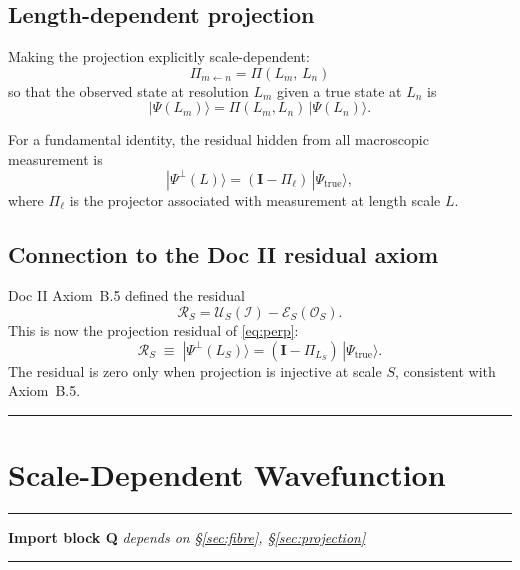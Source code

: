 \documentclass[11pt, a4paper, oneside]{article}
\theoremstyle{definition}
\theoremstyle{plain}
\theoremstyle{remark}
\newcommand{\Proj}[2]{\Pi_{#1 \leftarrow #2}}
\newcommand{\ProjL}{\Pi_{\ell}}
\newcommand{\Psitrue}{|\Psi_{\mathrm{true}}\rangle}
\begin{document}
\subsection{Length-dependent projection}

Making the projection explicitly scale-dependent:
\begin{equation}
  \Proj{m}{n} = \Pi(L_m,\, L_n)
  \label{eq:proj_length}
\end{equation}
so that the observed state at resolution $L_m$ given a true state at $L_n$ is
\begin{equation}
  |\Psi(L_m)\rangle = \Pi(L_m, L_n)\,|\Psi(L_n)\rangle.
  \label{eq:proj_length2}
\end{equation}

For a fundamental identity, the residual hidden from all macroscopic
measurement is
\begin{equation}
  |\Psi^\perp(L)\rangle = (\mathbf{I} - \ProjL)\,\Psitrue,
  \label{eq:perp}
\end{equation}
where $\ProjL$ is the projector associated with measurement at
length scale $L$.

\subsection{Connection to the Doc II residual axiom}

Doc II Axiom~B.5 defined the residual
\begin{equation}
  \mathcal{R}_S = \mathcal{U}_S(\mathcal{I}) - \mathcal{E}_S(\mathcal{O}_S).
  \tag{B.5}
\end{equation}
This is now the projection residual of \eqref{eq:perp}:
\begin{equation}
  \mathcal{R}_S \;\equiv\; |\Psi^\perp(L_S)\rangle
               = (\mathbf{I} - \Pi_{L_S})\,\Psitrue.
  \label{eq:residual_ident}
\end{equation}
The residual is zero only when projection is injective at scale $S$,
consistent with Axiom~B.5.

\noindent\rule{\linewidth}{0.4pt}

\section{Scale-Dependent Wavefunction}
\label{sec:wavefunction}

\noindent\rule{\linewidth}{0.8pt}
\textbf{Import block Q} \hfill \textit{depends on \S\ref{sec:fibre}, \S\ref{sec:projection}}
\noindent\rule{\linewidth}{0.4pt}
\end{document}
